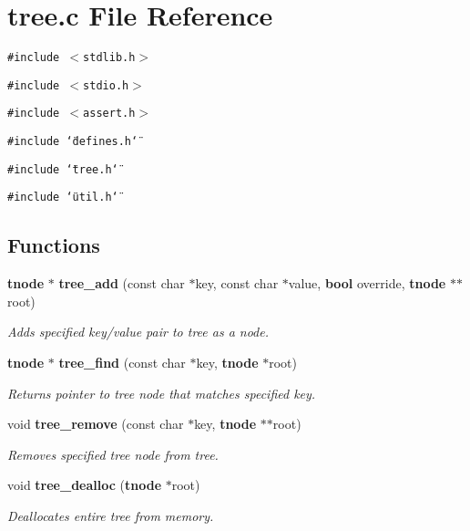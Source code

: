 \section{tree.c File Reference}
\label{tree_8c}
{\tt \#include $<$stdlib.h$>$}\par
{\tt \#include $<$stdio.h$>$}\par
{\tt \#include $<$assert.h$>$}\par
{\tt \#include \char`\"{}defines.h\char`\"{}}\par
{\tt \#include \char`\"{}tree.h\char`\"{}}\par
{\tt \#include \char`\"{}util.h\char`\"{}}\par
\subsection*{Functions}
\begin{CompactItemize}
\item 
{\bf tnode} $\ast$ {\bf tree\_\-add} (const char $\ast$key, const char $\ast$value, {\bf bool} override, {\bf tnode} $\ast$$\ast$root)
\begin{CompactList}\small\item\em Adds specified key/value pair to tree as a node.\item\end{CompactList}\item 
{\bf tnode} $\ast$ {\bf tree\_\-find} (const char $\ast$key, {\bf tnode} $\ast$root)
\begin{CompactList}\small\item\em Returns pointer to tree node that matches specified key.\item\end{CompactList}\item 
void {\bf tree\_\-remove} (const char $\ast$key, {\bf tnode} $\ast$$\ast$root)
\begin{CompactList}\small\item\em Removes specified tree node from tree.\item\end{CompactList}\item 
void {\bf tree\_\-dealloc} ({\bf tnode} $\ast$root)
\begin{CompactList}\small\item\em Deallocates entire tree from memory.\item\end{CompactList}\end{CompactItemize}


